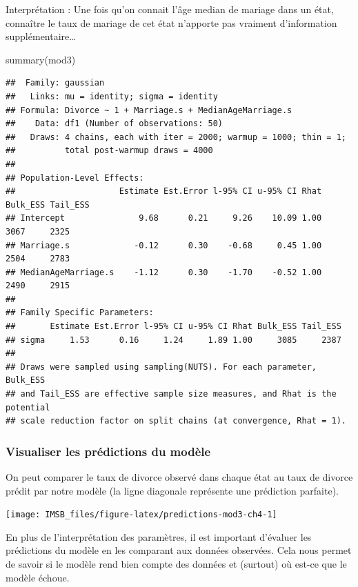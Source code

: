 \documentclass[
  a4paper,11pt,twoside,onecolumn,openright,final,oldfontcommands]{memoir}
\newenvironment{Shaded}{\begin{snugshade}}{\end{snugshade}}
\newcommand{\FunctionTok}[1]{\textcolor[rgb]{0.00,0.00,0.00}{#1}}
\newcommand{\NormalTok}[1]{#1}
\theoremstyle{definition}
\theoremstyle{definition}
\theoremstyle{definition}
\theoremstyle{definition}
\theoremstyle{remark}
\begin{document}
Interprétation : Une fois qu'on connait l'âge median de mariage dans un état, connaître le taux de mariage de cet état n'apporte pas vraiment d'information supplémentaire\ldots{}

\begin{Shaded}
\begin{Highlighting}[]
\FunctionTok{summary}\NormalTok{(mod3)}
\end{Highlighting}
\end{Shaded}

\begin{verbatim}
##  Family: gaussian 
##   Links: mu = identity; sigma = identity 
## Formula: Divorce ~ 1 + Marriage.s + MedianAgeMarriage.s 
##    Data: df1 (Number of observations: 50) 
##   Draws: 4 chains, each with iter = 2000; warmup = 1000; thin = 1;
##          total post-warmup draws = 4000
## 
## Population-Level Effects: 
##                     Estimate Est.Error l-95% CI u-95% CI Rhat Bulk_ESS Tail_ESS
## Intercept               9.68      0.21     9.26    10.09 1.00     3067     2325
## Marriage.s             -0.12      0.30    -0.68     0.45 1.00     2504     2783
## MedianAgeMarriage.s    -1.12      0.30    -1.70    -0.52 1.00     2490     2915
## 
## Family Specific Parameters: 
##       Estimate Est.Error l-95% CI u-95% CI Rhat Bulk_ESS Tail_ESS
## sigma     1.53      0.16     1.24     1.89 1.00     3085     2387
## 
## Draws were sampled using sampling(NUTS). For each parameter, Bulk_ESS
## and Tail_ESS are effective sample size measures, and Rhat is the potential
## scale reduction factor on split chains (at convergence, Rhat = 1).
\end{verbatim}

\hypertarget{visualiser-les-pruxe9dictions-du-moduxe8le}{%
\subsubsection{Visualiser les prédictions du modèle}\label{visualiser-les-pruxe9dictions-du-moduxe8le}}

On peut comparer le taux de divorce observé dans chaque état au taux de divorce prédit par notre modèle (la ligne diagonale représente une prédiction parfaite).

\begin{center}\texttt{[image: IMSB\_files/figure-latex/predictions-mod3-ch4-1]} \end{center}

En plus de l'interprétation des paramètres, il est important d'évaluer les prédictions du modèle en les comparant aux données observées. Cela nous permet de savoir si le modèle rend bien compte des données et (surtout) où est-ce que le modèle échoue.
\end{document}
